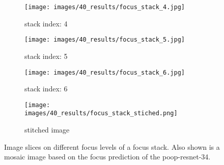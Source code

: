\begin{figure}
    \centering
    \begin{subfigure}[b]{\textwidth}
        \centering
        \texttt{[image: images/40\_results/focus\_stack\_4.jpg]}
        \caption{stack index: 4}
        \label{fig:Results:Stack:SideBySide:Index0}
        \vspace{1em}
    \end{subfigure}

    \begin{subfigure}[b]{\textwidth}
        \centering
        \texttt{[image: images/40\_results/focus\_stack\_5.jpg]}
        \caption{stack index: 5}
        \label{fig:Results:Stack:SideBySide:Index1}
        \vspace{1em}
    \end{subfigure}

    \begin{subfigure}[b]{\textwidth}
        \centering
        \texttt{[image: images/40\_results/focus\_stack\_6.jpg]}
        \caption{stack index: 6}
        \label{fig:Results:Stack:SideBySide:Index2}
        \vspace{1em}
    \end{subfigure}

    \begin{subfigure}[b]{\textwidth}
        \centering
        \texttt{[image: images/40\_results/focus\_stack\_stiched.png]}
        \caption{stitched image}
        \label{fig:Results:Stack:SideBySide:Stiched}
    \end{subfigure}
    \caption[Image slices of focus stack]{Image slices on different focus levels of a focus stack. Also shown is a mosaic image based on the focus prediction of the \acs{poop}-\acs{resnet}-34.}
    \label{fig:Results:Stack:SideBySide}
\end{figure}

